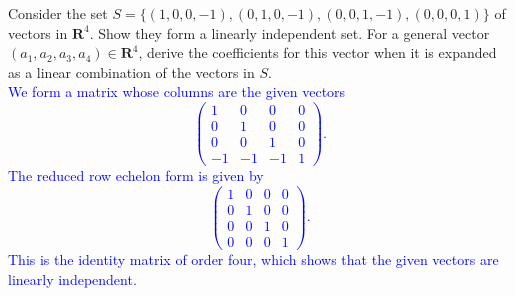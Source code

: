 \documentclass[a4paper,11pt]{article}
\newcommand{\R}{\mathbf{R}}
\newcommand{\BB}[1]{\textcolor{blue}{#1}}
\begin{document}
 Consider the set
$S=\{(1,0,0,-1),(0,1,0,-1),(0,0,1,-1),(0,0,0,1)\}$ of vectors in $\R^4$. Show
they form a linearly independent set. For a general vector $(a_1,a_2,a_3,a_4)
\in \R^4$, derive the coefficients for this vector when it is expanded as a
linear combination of the vectors in $S$. \\

\BB{We form a matrix whose columns are the given vectors
  \[
    \left(
      \begin{array}{rrrr}
        1 & 0 & 0 & 0 \\
        0 & 1 & 0 & 0 \\
        0 & 0 & 1 & 0 \\
        -1 & -1 & -1 & 1
      \end{array}
    \right).
  \]
  The reduced row echelon form is given by
  \[
    \left(
      \begin{array}{rrrr}
        1 & 0 & 0 & 0 \\
        0 & 1 & 0 & 0 \\
        0 & 0 & 1 & 0 \\
        0 & 0 & 0 & 1
      \end{array}
    \right).
  \]
  This is the identity matrix of order four, which shows that the given vectors
  are linearly independent.}
\end{document}
